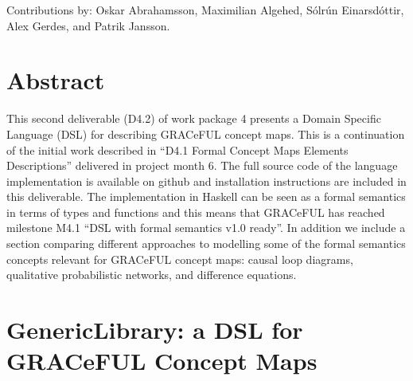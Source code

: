 \documentclass[]{article}
\begin{document}
Contributions by: Oskar Abrahamsson, Maximilian Algehed, Sólrún
Einarsdóttir, Alex Gerdes, and Patrik Jansson.

\vfill

\setcounter{tocdepth}{2}
\tableofcontents

\vfill

\newpage

\section*{Abstract}\label{abstract}

This second deliverable (D4.2) of work package 4 presents a Domain
Specific Language (DSL) for describing GRACeFUL concept maps.
%
This is a continuation of the initial work described in ``D4.1 Formal
Concept Maps Elements Descriptions'' delivered in project month 6.
%
The full source code of the language implementation is available on
github and installation instructions are included in this deliverable.
%
The implementation in Haskell can be seen as a formal semantics in
terms of types and functions and this means that GRACeFUL has reached
milestone M4.1 ``DSL with formal semantics v1.0 ready''.
%
In addition we include a section comparing different approaches to
modelling some of the formal semantics concepts relevant for GRACeFUL
concept maps: causal loop diagrams, qualitative probabilistic
networks, and difference equations.





\section{GenericLibrary: a DSL for GRACeFUL Concept Maps}
\label{sec:gl}




\end{document}
